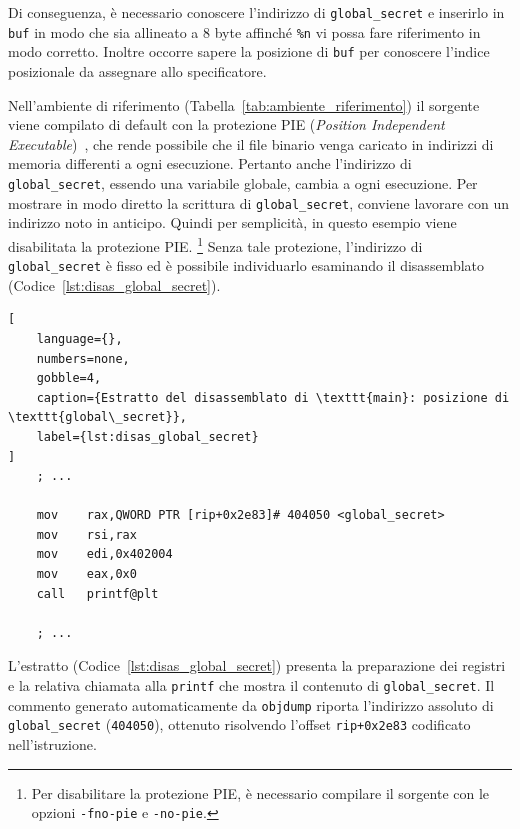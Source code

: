 Di conseguenza, è necessario conoscere l'indirizzo di \texttt{global\_secret} e inserirlo in \texttt{buf} in modo che sia allineato a 8 byte affinché \texttt{\%n} vi possa fare riferimento in modo corretto. Inoltre occorre sapere la posizione di \texttt{buf} per conoscere l'indice posizionale da assegnare allo specificatore.

Nell'ambiente di riferimento (Tabella~\ref{tab:ambiente_riferimento}) il sorgente viene compilato di default con la protezione PIE (\emph{Position Independent Executable})~\cite{openssfhardening}, che rende possibile che il file binario venga caricato in indirizzi di memoria differenti a ogni esecuzione. Pertanto anche l'indirizzo di \texttt{global\_secret}, essendo una variabile globale, cambia a ogni esecuzione.
Per mostrare in modo diretto la scrittura di \texttt{global\_secret}, conviene lavorare con un indirizzo noto in anticipo. Quindi per semplicità, in questo esempio viene disabilitata la protezione PIE.
\footnote{Per disabilitare la protezione PIE, è necessario compilare il sorgente con le opzioni \texttt{-fno-pie} e \texttt{-no-pie}.}
Senza tale protezione, l'indirizzo di \texttt{global\_secret} è fisso ed è possibile individuarlo esaminando il disassemblato (Codice~\ref{lst:disas_global_secret}).
\begin{lstlisting}[
    language={},
    numbers=none,
    gobble=4,
    caption={Estratto del disassemblato di \texttt{main}: posizione di \texttt{global\_secret}},
    label={lst:disas_global_secret}
]
    ; ...

    mov    rax,QWORD PTR [rip+0x2e83]# 404050 <global_secret>
    mov    rsi,rax
    mov    edi,0x402004
    mov    eax,0x0
    call   printf@plt
    
    ; ...
\end{lstlisting}
L'estratto (Codice~\ref{lst:disas_global_secret}) presenta la preparazione dei registri e la relativa chiamata alla \texttt{printf} che mostra il contenuto di \texttt{global\_secret}.
Il commento generato automaticamente da \texttt{objdump} riporta l'indirizzo assoluto di \texttt{global\_secret} (\texttt{404050}), ottenuto risolvendo l'offset \texttt{rip+0x2e83} codificato nell'istruzione.

